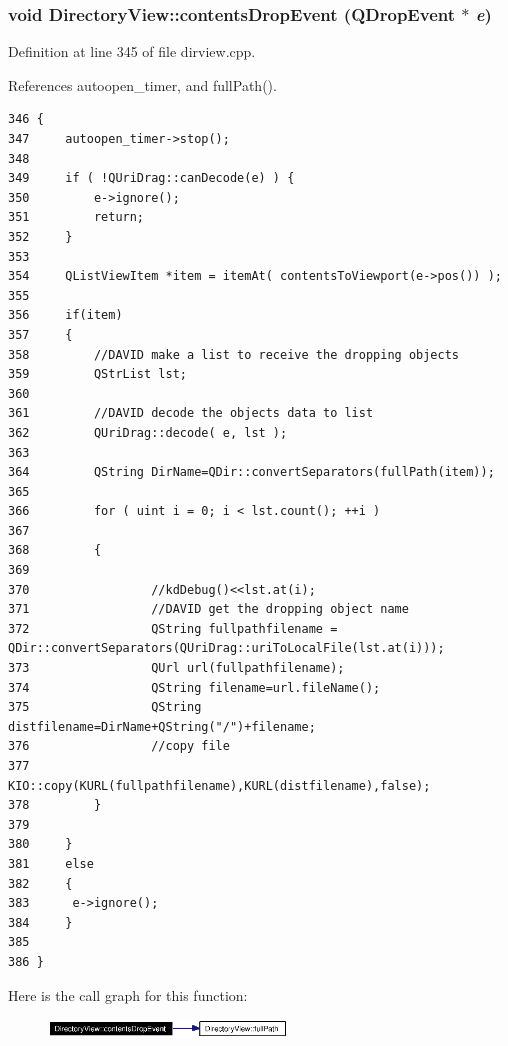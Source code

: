 \subsubsection{\setlength{\rightskip}{0pt plus 5cm}void Directory\-View::contents\-Drop\-Event (QDrop\-Event $\ast$ {\em e})\hspace{0.3cm}{\tt  [protected]}}\label{classDirectoryView_DirectoryViewb3}




Definition at line 345 of file dirview.cpp.

References autoopen\_\-timer, and full\-Path().



\footnotesize\begin{verbatim}346 {
347     autoopen_timer->stop();
348 
349     if ( !QUriDrag::canDecode(e) ) {
350         e->ignore();
351         return;
352     }
353 
354     QListViewItem *item = itemAt( contentsToViewport(e->pos()) );
355     
356     if(item)
357     {
358         //DAVID make a list to receive the dropping objects
359         QStrList lst;
360         
361         //DAVID decode the objects data to list
362         QUriDrag::decode( e, lst );
363         
364         QString DirName=QDir::convertSeparators(fullPath(item));
365 
366         for ( uint i = 0; i < lst.count(); ++i ) 
367         
368         {
369                 
370                 //kdDebug()<<lst.at(i);
371                 //DAVID get the dropping object name
372                 QString fullpathfilename = QDir::convertSeparators(QUriDrag::uriToLocalFile(lst.at(i)));
373                 QUrl url(fullpathfilename);
374                 QString filename=url.fileName();
375                 QString distfilename=DirName+QString("/")+filename;
376                 //copy file
377                 KIO::copy(KURL(fullpathfilename),KURL(distfilename),false);
378         }
379         
380     }
381     else
382     {
383      e->ignore();
384     }
385 
386 }
\end{verbatim}\normalsize 


Here is the call graph for this function:\begin{figure}[H]
\begin{center}
\leavevmode
\includegraphics[width=180pt]{classDirectoryView_DirectoryViewb3_cgraph}
\end{center}
\end{figure}
